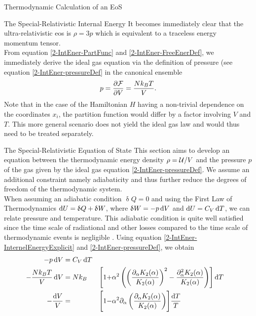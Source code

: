 \begin{section}{Thermodynamic Calculation of an EoS}
\begin{subsection}{The Special-Relativistic Internal Energy}
It becomes immediately clear that the ultra-relativistic \ac{eos} is $\rho=3p$ which is equivalent to a traceless energy momentum tensor.\\
From equation \eqref{2-IntEner-PartFunc} and \eqref{2-IntEner-FreeEnerDef}, we immediately derive the ideal gas equation via the definition of pressure (see equation \eqref{2-IntEner-pressureDef} in the canonical ensemble
\begin{equation}
    p=\frac{\partial\mathcal{F}}{\partial V} = \frac{Nk_ BT}{V}.
    \label{2-IntEner-IdealGasEq}
\end{equation}
Note that in the case of the Hamiltonian $H$ having a non-trivial dependence on the coordinates $x_i$, the partition function would differ by a factor involving $V$ and $T$.
This more general scenario does not yield the ideal gas law and would thus need to be treated separately.
\end{subsection}
%
%
%
\begin{subsection}{The Special-Relativistic Equation of State}
\label{2-IntEner-SR-EOS-Derivation}
This section aims to develop an equation between the thermodynamic energy density $\rho=\mathcal{U}/V$ and the pressure $p$ of the gas given by the ideal gas equation \eqref{2-IntEner-pressureDef}. 
We assume an additional constraint namely adiabaticity and thus further reduce the degrees of freedom of the thermodynamic system.\\ %
When assuming an adiabatic condition $\updelta Q=0$ and using the First Law of Thermodynamics \cite{fliessbachStatistischePhysikLehrbuch2018} $\mathop{}\!\mathrm{d} U =\updelta Q + \updelta W$, where $\updelta W=-p\mathop{}\!\mathrm{d} V$ and $\mathop{}\!\mathrm{d} U=C_V\mathop{}\!\mathrm{d} T$, we can relate pressure and temperature. 
This adiabatic condition is quite well satisfied since the time scale of radiational and other losses compared to the time scale of thermodynamic events is negligible \cite{noerdlingerSolarMassLoss2008, vinkMassLossStellar2017}.
Using equation \eqref{2-IntEner-InternelEnergyExplicit} and \eqref{2-IntEner-pressureDef}, we obtain
\begin{alignat}{3}
    -p\diff V &= C_V\diff T\\
    -\frac{Nk_BT}{V}\diff V &= Nk_B &\Biggl[1 + &\alpha^2\left(\left(\frac{\partial_\alpha K_2(\alpha)}{K_2(\alpha)}\right)^2 - \frac{\partial^2_\alpha K_2(\alpha)}{K_2(\alpha)}\right)\Biggr]\diff T\\
    - \frac{\diff V}{V} &= &\Biggl[1 - &\alpha^2\partial_\alpha\left(\frac{\partial_\alpha K_2(\alpha)}{K_2(\alpha)}\right)\Biggr]\frac{\diff T}{T}\\

\end{alignat}
\end{subsection}
\end{section}
